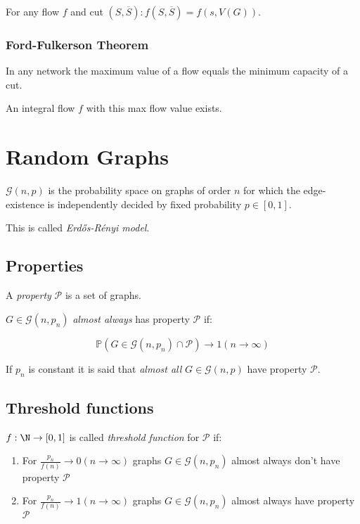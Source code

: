 \spacing

For any flow $f$ and cut $(S,\overline S) : f(S,\overline S) = f(s,V(G))$.

\subsubsection*{Ford-Fulkerson Theorem}

In any network the maximum value of a flow equals the minimum capacity of a cut.

An integral flow $f$ with this max flow value exists.

\section*{Random Graphs}

$\mathcal{G}(n,p)$ is the probability space on graphs of order $n$ for which the edge-existence is independently decided by fixed probability $p \in [0,1]$.

This is called \emph{Erd\H{o}s-R\'{e}nyi model}.

\subsection*{Properties}

A \emph{property} $\mathcal{P}$ is a set of graphs.

$G \in \mathcal{G}(n,p_n)$ \emph{almost always} has property $\mathcal{P}$ if:

\vspace*{-2mm}
\[ \mathbb{P}(G \in \mathcal{G}(n,p_n) \cap \mathcal{P}) \to 1 (n \to \infty) \]

If $p_n$ is constant it is said that \emph{almost all} $G \in \mathcal{G}(n,p)$ have property $\mathcal{P}$.

\subsection*{Threshold functions}

$f : \N \to [0,1]$ is called \emph{threshold function} for $\mathcal{P}$ if:

\begin{enumerate}
	\item For $\frac{p_n}{f(n)} \to 0 (n \to \infty)$ graphs $G \in \mathcal{G}(n,p_n)$ almost always don't have property $\mathcal{P}$
	\item For $\frac{p_n}{f(n)} \to 1 (n \to \infty)$ graphs $G \in \mathcal{G}(n,p_n)$ almost always have property $\mathcal{P}$
\end{enumerate}


